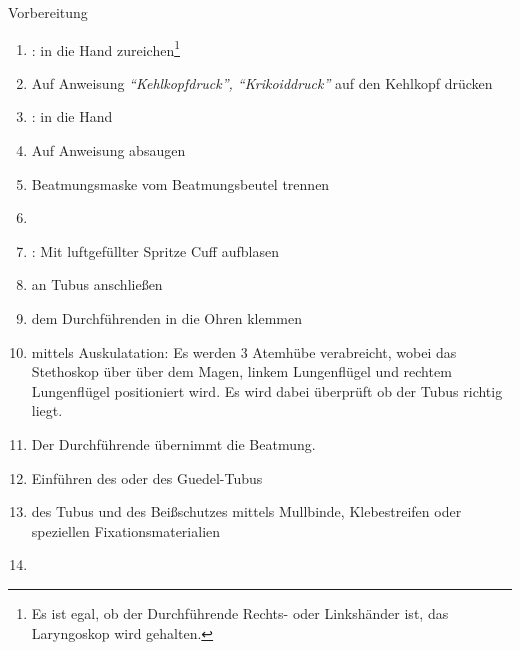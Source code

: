 \documentclass[
ngerman,
paper=a4,
asymmetric,
fontsize=8pt,
draft=false,
numbers=noenddot,
bibtotocnumbered,
footnotes=multiple,
toc=flat,
]{scrbook}
\begin{document}
\begin{ProcedureStepsWide}{Vorbereitung}
\begin{enumerate}
{  Durchführende wird nun einige Zeit den Patienten mittels
  Beutel-/Masken-Beatmung beatmen (sofern nicht bereits
  geschehen).}
  \item {}: in die 
  Hand zureichen\footnote{Es ist egal, ob der Durchführende
  Rechts- oder Linkshänder ist, das Laryngoskop wird
   gehalten.}
  \item Auf Anweisung \emph{\enquote{Kehlkopfdruck},
  \enquote{Krikoiddruck}} auf den Kehlkopf drücken
  \item {}: in die  Hand
  \item Auf Anweisung absaugen
  \item Beatmungsmaske vom Beatmungsbeutel trennen
  \item {}
  \item {}: Mit luftgefüllter Spritze Cuff
  aufblasen
  \item {} an Tubus anschließen
  \item {} dem Durchführenden in die Ohren
  klemmen
  \item {} mittels Auskulatation: Es werden
  3 Atemhübe verabreicht, wobei das Stethoskop über über dem Magen, linkem Lungenflügel und
  rechtem Lungenflügel positioniert wird. Es wird dabei
  überprüft ob der Tubus richtig liegt.
  \item Der Durchführende übernimmt die Beatmung.
  \item Einführen des  oder des Guedel-Tubus
  \item {} des Tubus und des Beißschutzes
  mittels Mullbinde, Klebestreifen oder speziellen
  Fixationsmaterialien
  \item {}
\end{enumerate}
\end{ProcedureStepsWide}
\end{document}
